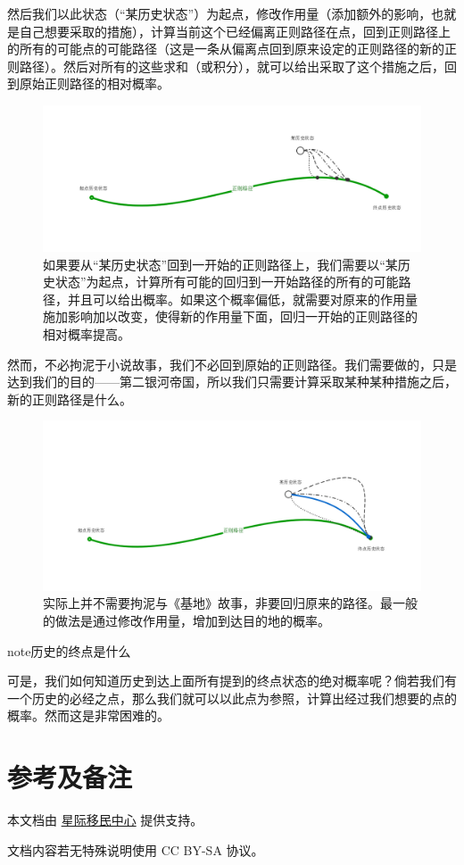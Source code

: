\documentclass[letterpaper,10pt,english]{sphinxmanual}
\begin{document}
然后我们以此状态（“某历史状态”）为起点，修改作用量（添加额外的影响，也就是自己想要采取的措施），计算当前这个已经偏离正则路径在点，回到正则路径上的所有的可能点的可能路径（这是一条从偏离点回到原来设定的正则路径的新的正则路径）。然后对所有的这些求和（或积分），就可以给出采取了这个措施之后，回到原始正则路径的相对概率。
\begin{figure}[htbp]
\centering
\capstart

\includegraphics{psychohistory-modi.png}
\caption{如果要从“某历史状态”回到一开始的正则路径上，我们需要以“某历史状态”为起点，计算所有可能的回归到一开始路径的所有的可能路径，并且可以给出概率。如果这个概率偏低，就需要对原来的作用量施加影响加以改变，使得新的作用量下面，回归一开始的正则路径的相对概率提高。}\end{figure}

然而，不必拘泥于小说故事，我们不必回到原始的正则路径。我们需要做的，只是达到我们的目的——第二银河帝国，所以我们只需要计算采取某种某种措施之后，新的正则路径是什么。
\begin{figure}[htbp]
\centering
\capstart

\includegraphics{psychohistory-modi2.png}
\caption{实际上并不需要拘泥与《基地》故事，非要回归原来的路径。最一般的做法是通过修改作用量，增加到达目的地的概率。}\end{figure}

\begin{notice}{note}{历史的终点是什么}

可是，我们如何知道历史到达上面所有提到的终点状态的绝对概率呢？倘若我们有一个历史的必经之点，那么我们就可以以此点为参照，计算出经过我们想要的点的概率。然而这是非常困难的。
\end{notice}


\chapter{参考及备注}
\label{index:id3}
本文档由 \href{http://interimm.github.io/}{星际移民中心} 提供支持。

文档内容若无特殊说明使用 CC BY-SA 协议。



\renewcommand{\indexname}{Index}
\printindex
\end{document}
